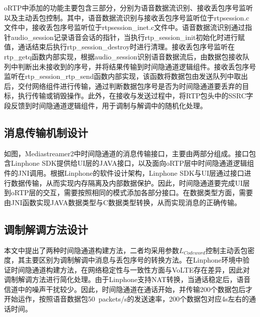 oRTP中添加的功能主要包含三部分，分别为语音数据流识别、接收丢包序号监听以及主动丢包控制。其中，语音数据流识别与接收丢包序号监听位于rtpsession.c文件中，接收丢包序号监听位于rtpsession\_inet.c文件中。语音数据流识别通过指针audio\_session记录语音会话的指针，当执行rtp\_session\_init初始化时进行赋值，通话结束后执行rtp\_session\_destroy时进行清理。接收丢包序号监听在rtp\_getq函数内部实现，根据audio\_session识别语音数据流后，由数据包接收队列中判断出未接收到的序号，并将结果传输到时间隐通道逻辑组件。接收丢包序号监听在rtp\_session\_rtp\_send函数内部实现，该函数将数据包由发送队列中取出后，交付网络组件进行传输，通过判断数据包序号是否为时间隐通道要丢弃的目标，执行传输或销毁操作。此外，在接收与发送过程中，将RTP包头中的SSRC字段反馈到时间隐通道逻辑组件，用于调制与解调中的随机化处理。

\subsection{消息传输机制设计}
\label{chap:linphone:designation:data}


如图，Mediastreamer2中时间隐通道的消息传输接口，主要由两部分组成。接口包含Linphone SDK提供给UI层的JAVA接口，以及面向oRTP层中时间隐通道逻辑组件的JNI调用。根据Linphone的软件设计架构，Linphone SDK与UI层通过接口进行数据传输，从而实现内存隔离及内部数据保护。因此，时间隐通道要完成UI层到oRTP层的交互，需要按照相同的模式添加各部分接口。在数据类型方面，需要由JNI函数实现JAVA数据类型与C数据类型转换，从而实现消息的正确传输。

\subsection{调制解调方法设计}
\label{chap:linphone:designation:modulation}

本文中提出了两种时间隐通道构建方法，二者均采用参数$L_{Codeword}$控制主动丢包密度，其主要区别为调制解调中消息与丢包序号的转换方法。在Linphone环境中验证时间隐通道构建方法，在网络稳定性与一致性方面与VoLTE存在差异，因此对调制解调方法进行简化处理。由于Linphone支持NAT转换，当通话稳定后，语音信道中的噪声干扰较少。因此，时间隐通道在通话开始，并传输200个数据包后才开始运作，按照语音数据包50\ packets/s的发送速率，200个数据包对应4s左右的通话时间。

